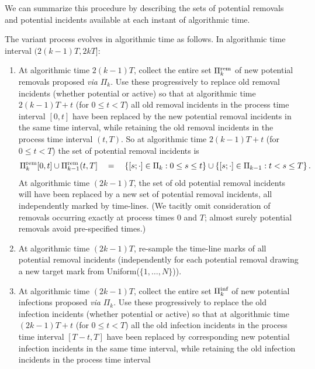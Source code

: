 \documentclass[]{article}
\newcommand{\Population}{N}
\newcommand{\Poisson}{\Pi}
\newcommand{\PoissonRem}{\Poisson^\textup{rem}}
\newcommand{\PoissonInf}{\Poisson^\textup{inf}}
\begin{document}
We can summarize this procedure by describing the sets of potential removals
and potential incidents available at each instant of algorithmic time.%
\begin{defn}
The variant process evolves in algorithmic time as follows.
\label{def:detailed}
In algorithmic time interval \((2(k{-}1)T, 2kT]\):
\begin{enumerate}
\item\label{item:detailed-removals}
At algorithmic time \(2(k{-}1)T\),
collect the entire set 
\(\PoissonRem_k\)
of new potential removals
 proposed \emph{via} \(\Pi_k\).
Use these progressively to replace
old removal incidents 
(whether potential or active)
so that  
at algorithmic time \(2(k{-}1)T+t\) (for \(0\leq t<T\))
all old removal incidents in the process time
interval \([0,t]\) have been replaced by 
the new potential removal incidents
in the same time interval, 
while retaining the old removal incidents 
in the process time interval 
\((t,T)\).
So at algorithmic time \(2(k{-}1)T+t\) (for \(0\leq t<T\)) the set of potential removal incidents is
\[
\PoissonRem_k[0,t] \cup \PoissonRem_{k-1}(t,T] \quad = \quad
\{[s;\cdot]\in\Poisson_k: 0\leq s\leq t\}
\cup
\{[s;\cdot]\in\Poisson_{k-1}: t<s\leq T \}
\,.
\]
At algorithmic time \((2k{-}1)T\), the set of old
potential removal incidents will have been replaced by a new set of
potential removal incidents, 
all
independently marked by time-lines.
(We tacitly omit consideration 
of removals occurring exactly at process times \(0\) and \(T\);
almost surely potential removals avoid pre-specified times.)
\item\label{item:detailed-re-mark-removals}
At algorithmic time \((2k{-}1)T\),
re-sample the time-line marks of
all potential removal incidents
(independently for each potential removal drawing a new target
mark from 
Uniform(\(\{1,\dots,\Population\}\))).
\item\label{item:detailed-infections}
At algorithmic time \((2k{-}1)T\),
collect the entire set
\(\PoissonInf_k\)
of new potential infections
proposed \emph{via} \(\Pi_k\).
Use these progressively to replace
the old infection incidents 
(whether potential or active)
so that  
at algorithmic time \((2k{-}1)T+t\) (for \(0\leq t<T\))
all the old infection incidents in the process time interval 
\([T{-}t,T]\) 
have been replaced by 
corresponding new potential infection incidents 
in the same time interval, 
while retaining the old infection incidents in the process time interval 

\end{enumerate}
\end{defn}
\end{document}
